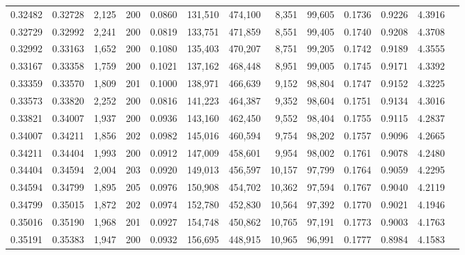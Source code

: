 \begin{tabular}{rrrrrrrrrrrrr}
0.32482 & 0.32728 & 2,125 & 200 &                                     0.0860 & 131,510 & 474,100 &   8,351 &  99,605 & 0.1736 & 0.9226 & 4.3916 \\
0.32729 & 0.32992 & 2,241 & 200 &                                     0.0819 & 133,751 & 471,859 &   8,551 &  99,405 & 0.1740 & 0.9208 & 4.3708 \\
0.32992 & 0.33163 & 1,652 & 200 &                                     0.1080 & 135,403 & 470,207 &   8,751 &  99,205 & 0.1742 & 0.9189 & 4.3555 \\
0.33167 & 0.33358 & 1,759 & 200 &                                     0.1021 & 137,162 & 468,448 &   8,951 &  99,005 & 0.1745 & 0.9171 & 4.3392 \\
0.33359 & 0.33570 & 1,809 & 201 &                                     0.1000 & 138,971 & 466,639 &   9,152 &  98,804 & 0.1747 & 0.9152 & 4.3225 \\
0.33573 & 0.33820 & 2,252 & 200 &                                     0.0816 & 141,223 & 464,387 &   9,352 &  98,604 & 0.1751 & 0.9134 & 4.3016 \\
0.33821 & 0.34007 & 1,937 & 200 &                                     0.0936 & 143,160 & 462,450 &   9,552 &  98,404 & 0.1755 & 0.9115 & 4.2837 \\
0.34007 & 0.34211 & 1,856 & 202 &                                     0.0982 & 145,016 & 460,594 &   9,754 &  98,202 & 0.1757 & 0.9096 & 4.2665 \\
0.34211 & 0.34404 & 1,993 & 200 &                                     0.0912 & 147,009 & 458,601 &   9,954 &  98,002 & 0.1761 & 0.9078 & 4.2480 \\
0.34404 & 0.34594 & 2,004 & 203 &                                     0.0920 & 149,013 & 456,597 &  10,157 &  97,799 & 0.1764 & 0.9059 & 4.2295 \\
0.34594 & 0.34799 & 1,895 & 205 &                                     0.0976 & 150,908 & 454,702 &  10,362 &  97,594 & 0.1767 & 0.9040 & 4.2119 \\
0.34799 & 0.35015 & 1,872 & 202 &                                     0.0974 & 152,780 & 452,830 &  10,564 &  97,392 & 0.1770 & 0.9021 & 4.1946 \\
0.35016 & 0.35190 & 1,968 & 201 &                                     0.0927 & 154,748 & 450,862 &  10,765 &  97,191 & 0.1773 & 0.9003 & 4.1763 \\
0.35191 & 0.35383 & 1,947 & 200 &                                     0.0932 & 156,695 & 448,915 &  10,965 &  96,991 & 0.1777 & 0.8984 & 4.1583 \\

\end{tabular}
